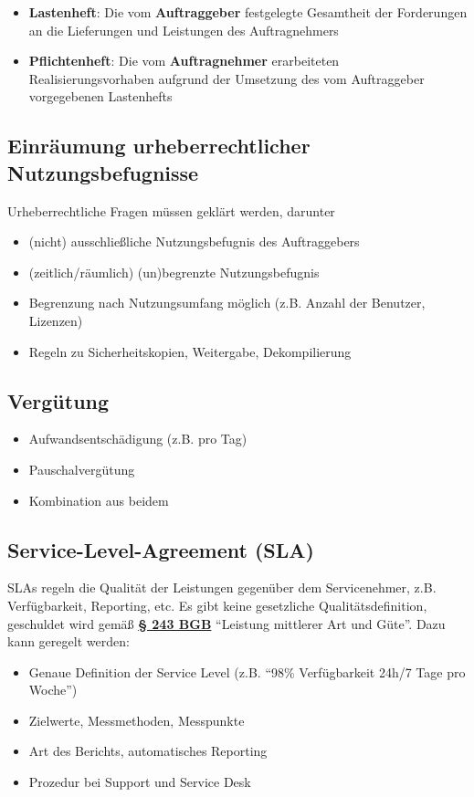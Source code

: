\documentclass[12pt,A4]{extarticle}
\newcommand{\highlight}[1]{\textcolor{highlightColor}{\textbf{#1}}}
\newcommand{\bgb}[2][]{\textbf{\textcolor{gesetzLink}{\href{https://www.gesetze-im-internet.de/bgb/__#2.html}{§ #2 \ifthenelse{\equal{#1}{}}{}{#1 }BGB}}}}
\begin{document}
\begin{itemize}
  \item{\highlight{Lastenheft}: Die vom \textbf{Auftraggeber} festgelegte Gesamtheit der Forderungen an die Lieferungen und Leistungen des Auftragnehmers}
  \item {\highlight{Pflichtenheft}: Die vom \textbf{Auftragnehmer} erarbeiteten Realisierungsvorhaben aufgrund der Umsetzung des vom Auftraggeber vorgegebenen Lastenhefts}
\end{itemize}

\subsection{Einräumung urheberrechtlicher Nutzungsbefugnisse}
Urheberrechtliche Fragen müssen geklärt werden, darunter

\begin{itemize}
  \item{(nicht) ausschließliche Nutzungsbefugnis des Auftraggebers}
  \item{(zeitlich/räumlich) (un)begrenzte Nutzungsbefugnis}
  \item{Begrenzung nach Nutzungsumfang möglich (z.B. Anzahl der Benutzer, Lizenzen)}
  \item{Regeln zu Sicherheitskopien, Weitergabe, Dekompilierung}
\end{itemize}

\subsection{Vergütung}

\begin{itemize}
  \item{Aufwandsentschädigung (z.B. pro Tag)}
  \item{Pauschalvergütung}
  \item{Kombination aus beidem}
\end{itemize}

\subsection{Service-Level-Agreement (SLA)}
SLAs regeln die Qualität der Leistungen gegenüber dem Servicenehmer, z.B. Verfügbarkeit, Reporting, etc. Es gibt keine gesetzliche Qualitätsdefinition, geschuldet wird gemäß \bgb[Abs. 1]{243} ``Leistung mittlerer Art und Güte''. Dazu kann geregelt werden:

\begin{itemize}
  \item{Genaue Definition der Service Level (z.B. ``98\% Verfügbarkeit 24h/7 Tage pro Woche'')}
  \item{Zielwerte, Messmethoden, Messpunkte}
  \item{Art des Berichts, automatisches Reporting}
  \item{Prozedur bei Support und Service Desk}
\end{itemize}
\end{document}
